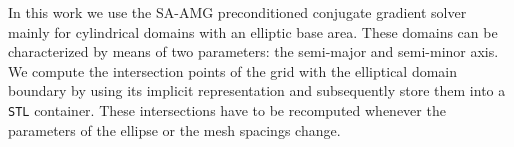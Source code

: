 In this work we use the SA-AMG preconditioned conjugate gradient solver
mainly for cylindrical domains with an elliptic base area.  These
domains can be characterized by means of two parameters: the semi-major
and semi-minor axis.  We compute the intersection points of the grid
with the elliptical domain boundary by using its implicit representation
and subsequently store them into a \texttt{STL} container.  These
intersections have to be recomputed whenever the parameters of the
ellipse or the mesh spacings change.


